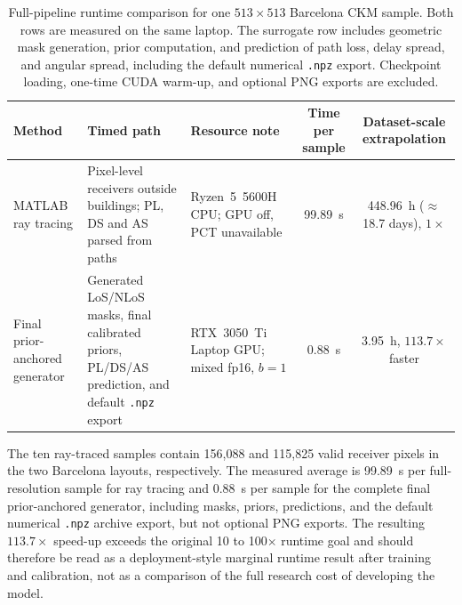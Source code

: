 \begin{table}[H]
\centering
\caption[Full-pipeline runtime and ray-tracing comparison.]
{Full-pipeline runtime comparison for one \(513\times513\) Barcelona CKM sample.
Both rows are measured on the same laptop. The surrogate row includes geometric
mask generation, prior computation, and prediction of path loss, delay spread,
and angular spread, including the default numerical \texttt{.npz} export.
Checkpoint loading, one-time CUDA warm-up, and optional PNG exports are
excluded.}
\label{tab:inference_time_comparison}
\scriptsize
\begin{tabularx}{\textwidth}{>{\raggedright\arraybackslash}p{2.35cm}>{\raggedright\arraybackslash}X>{\raggedright\arraybackslash}p{2.25cm}cc}
\toprule
Method & Timed path & Resource note & Time per sample & Dataset-scale extrapolation \\
\midrule
MATLAB ray tracing & Pixel-level receivers outside buildings; PL, DS and AS parsed from paths & Ryzen~5~5600H CPU; GPU off, PCT unavailable & \SI{99.89}{s} & \SI{448.96}{h} (\(\approx\)18.7 days), \(1\times\) \\
Final prior-anchored generator & Generated LoS/NLoS masks, final calibrated priors, PL/DS/AS prediction, and default \texttt{.npz} export & RTX~3050~Ti Laptop GPU; mixed fp16, \(b=1\) & \SI{0.88}{s} & \SI{3.95}{h}, \(113.7\times\) faster \\
\bottomrule
\end{tabularx}
\end{table}
\normalsize

The ten ray-traced samples contain 156{,}088 and 115{,}825 valid receiver
pixels in the two Barcelona layouts, respectively. The measured average is
\SI{99.89}{s} per full-resolution sample for ray tracing and \SI{0.88}{s} per
sample for the complete final prior-anchored generator, including masks,
priors, predictions, and the default numerical \texttt{.npz} archive export,
but not optional PNG exports. The
resulting \(113.7\times\) speed-up exceeds the original 10 to 100\(\times\)
runtime goal and should therefore be read as a
deployment-style marginal runtime result after training and calibration, not as
a comparison of the full research cost of developing the model.

